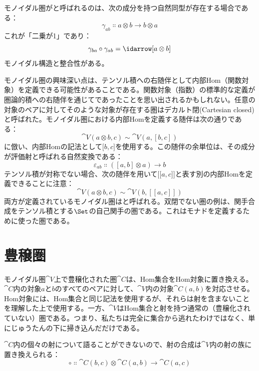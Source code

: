 \begin{figure}[H]
  \centering
\end{figure}

\noindent
モノイダル圏がと呼ばれるのは、次の成分を持つ自然同型が存在する場合である：
\[\gamma_{a b} \Colon a \otimes b \to b \otimes a\]
これが「二乗が1」であり：
\[\gamma_{b a} \circ \gamma_{a b} = \idarrow[a \otimes b]\]
モノイダル構造と整合性がある。

モノイダル圏の興味深い点は、テンソル積への右随伴として内部Hom（関数対象）を定義できる可能性があることである。関数対象（指数）の標準的な定義が圏論的積への右随伴を通じてであったことを思い出されるかもしれない。任意の対象のペアに対してそのような対象が存在する圏はデカルト閉(Cartesian closed)と呼ばれた。モノイダル圏における内部Homを定義する随伴は次の通りである：
\[\cat{V}(a \otimes b, c) \sim \cat{V}(a, [b, c])\]
に倣い、内部Homの記法として${[}b, c{]}$を使用する。この随伴の余単位は、その成分が評価射と呼ばれる自然変換である：
\[\varepsilon_{a b} \Colon ([a, b] \otimes a) \to b\]
テンソル積が対称でない場合、次の随伴を用いて${[}{[}a, c{]}{]}$と表す別の内部Homを定義できることに注意：
\[\cat{V}(a \otimes b, c) \sim \cat{V}(b, [[a, c]])\]
両方が定義されているモノイダル圏はと呼ばれる。双閉でない圏の例は、関手合成をテンソル積とする$\Set$の自己関手の圏である。これはモナドを定義するために使った圏である。

\section{豊穣圏}

モノイダル圏$\cat{V}$上で豊穣化された圏$\cat{C}$は、Hom集合をHom対象に置き換える。$\cat{C}$内の対象$a$と$b$のすべてのペアに対して、$\cat{V}$内の対象$\cat{C}(a, b)$を対応させる。Hom対象には、Hom集合と同じ記法を使用するが、それらは射を含まないことを理解した上で使用する。一方、$\cat{V}$はHom集合と射を持つ通常の（豊穣化されていない）圏である。つまり、私たちは完全に集合から逃れたわけではなく、単にじゅうたんの下に掃き込んだだけである。

$\cat{C}$内の個々の射について語ることができないので、射の合成は$\cat{V}$内の射の族に置き換えられる：
\[\circ \Colon \cat{C}(b, c) \otimes \cat{C}(a, b) \to \cat{C}(a, c)\]


